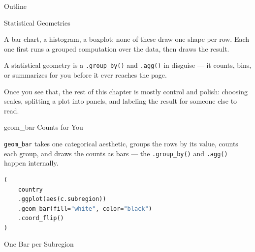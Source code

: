 \documentclass[8pt,aspectratio=169]{beamer}
\begin{document}
\begin{outlineframe}{Outline}
\end{outlineframe}


\begin{textframe}{Statistical Geometries}

A bar chart, a histogram, a boxplot: none of these draw one shape per row. Each one first runs a grouped computation over the data, then draws the result.

A statistical geometry is a \texttt{.group\_by()} and \texttt{.agg()} in disguise --- it counts, bins, or summarizes for you before it ever reaches the page.

Once you see that, the rest of this chapter is mostly control and polish: choosing scales, splitting a plot into panels, and labeling the result for someone else to read.

\end{textframe}

\begin{frame}[fragile]{geom\_bar Counts for You}
\begin{splitcode}{%

\texttt{geom\_bar} takes one categorical aesthetic, groups the rows by its value, counts each group, and draws the counts as bars --- the \texttt{.group\_by()} and \texttt{.agg()} happen internally.

}
\begin{lstlisting}[language=Python]
(
    country
    .ggplot(aes(c.subregion))
    .geom_bar(fill="white", color="black")
    .coord_flip()
)
\end{lstlisting}
\end{splitcode}
\end{frame}

\begin{rightframe}{One Bar per Subregion}
\end{rightframe}
\end{document}

